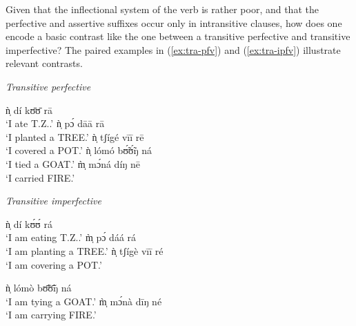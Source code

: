 Given that  the inflectional system of the verb is rather poor, and that the 
perfective
and assertive suffixes occur only in intransitive clauses,  how does one
encode a basic contrast like the one between a transitive perfective and
transitive imperfective? The paired examples in (\ref{ex:tra-pfv}) and
(\ref{ex:tra-ipfv})  illustrate 
 relevant contrasts.


  \begin{minipage}[h]{12cm}
\begin{multicols}{2}
\begin{exe}
  \ex\label{ex:tra-pfv}{\it Transitive perfective}
\begin{xlist}
  \ex\label{ex:tra-pfv-eat}
ǹ̩ dí kʊ̄ʊ̄ rā\\
 `I ate T.Z..' 
 \ex\label{ex:tra-pfv-plant}
ǹ̩ pɔ́ dāā rā\\
`I planted a TREE.'
 \ex\label{ex:tra-pfv-cover}
ǹ̩ tʃígé vīī rē\\
`I covered a POT.' 
 \ex\label{ex:tra-pfv-tie}
ǹ̩ lómó bʊ̃́ʊ̃́ŋ ná\\
`I tied a GOAT.' 
 \ex\label{ex:tra-pfv-carry}
m̩̀ mɔ́ná díŋ nē\\
`I carried  FIRE.' 
\end{xlist}
\end{exe}

\begin{exe}
  \ex\label{ex:tra-ipfv}{\it Transitive imperfective}
\begin{xlist}
 \ex\label{ex:tra-ipfv-eat}
ǹ̩ dí kʊ́ʊ́ rá\\
`I am eating T.Z..' 
 \ex\label{ex:tra-ipfv-plant}
m̩̀ pɔ́ dáá rá\\
`I am planting a TREE.' 
 \ex\label{ex:tra-ipfv-cover}
ǹ̩ tʃígè vīī ré\\
`I am covering  a POT.' 

 \ex\label{ex:tra-ipfv-tie}
ǹ̩ lómò bʊ̃̄ʊ̃̄ŋ ná\\
`I am tying  a GOAT.' 
 \ex\label{ex:tra-ipfv-carry}
m̩̀ mɔ́nà dīŋ né\\
`I am carrying  FIRE.' 
\end{xlist}
\end{exe}
\end{multicols}
 \end{minipage}
\vspace*{15pt}

% 
% 

